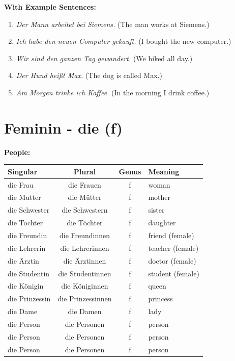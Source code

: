 \bigskip
\noindent\textbf{With Example Sentences:}

\begin{enumerate}
    \item \textit{Der Mann arbeitet bei Siemens.} (The man works at Siemens.)
    \item \textit{Ich habe den neuen Computer gekauft.} (I bought the new computer.)
    \item \textit{Wir sind den ganzen Tag gewandert.} (We hiked all day.)
    \item \textit{Der Hund heißt Max.} (The dog is called Max.)
    \item \textit{Am Morgen trinke ich Kaffee.} (In the morning I drink coffee.)
\end{enumerate}

\section{Feminin - die (f)}
\label{sec:FemininNomen}

\bigskip
\noindent\textbf{People:}

\begin{center}
\begin{tabular}{|l|c|c|l|}
\hline
Singular & Plural & Genus & Meaning \\ \hline
die Frau & die Frauen & f & woman \\ \hline
die Mutter & die Mütter & f & mother \\ \hline
die Schwester & die Schwestern & f & sister \\ \hline
die Tochter & die Töchter & f & daughter \\ \hline
die Freundin & die Freundinnen & f & friend (female) \\ \hline
die Lehrerin & die Lehrerinnen & f & teacher (female) \\ \hline
die Ärztin & die Ärztinnen & f & doctor (female) \\ \hline
die Studentin & die Studentinnen & f & student (female) \\ \hline
die Königin & die Königinnen & f & queen \\ \hline
die Prinzessin & die Prinzessinnen & f & princess \\ \hline
die Dame & die Damen & f & lady \\ \hline
die Person & die Personen & f & person \\ \hline
die Person & die Personen & f & person \\ \hline
die Person & die Personen & f & person \\ \hline
\end{tabular}
\end{center}

